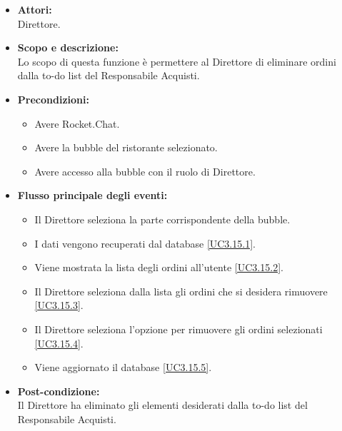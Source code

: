 \begin{itemize}
	\item \textbf{Attori:}
	\\Direttore.
	\item \textbf{Scopo e descrizione:} 
	\\Lo scopo di questa funzione è permettere al Direttore di eliminare ordini dalla to-do list del Responsabile Acquisti.
	\item \textbf{Precondizioni:}
	\begin{itemize}
		\item Avere Rocket.Chat.
		\item Avere la bubble del ristorante selezionato.
		\item Avere accesso alla bubble con il ruolo di Direttore.
	\end{itemize}
	\item \textbf{Flusso principale degli eventi:}
	\begin{itemize}
		\item Il Direttore seleziona la parte corrispondente della bubble.
		\item I dati vengono recuperati dal database \ref{UC3.15.1}.
		\item Viene mostrata la lista degli ordini all'utente \ref{UC3.15.2}.
		\item Il Direttore seleziona dalla lista gli ordini che si desidera rimuovere \ref{UC3.15.3}.
		\item Il Direttore seleziona l'opzione per rimuovere gli ordini selezionati \ref{UC3.15.4}.
		\item Viene aggiornato il database \ref{UC3.15.5}.
	\end{itemize}
	\item \textbf{Post-condizione:}
	\\Il Direttore ha eliminato gli elementi desiderati dalla to-do list del Responsabile Acquisti.
\end{itemize}


